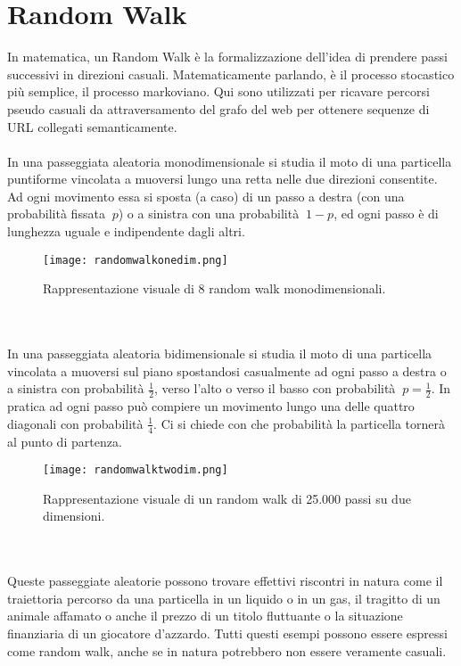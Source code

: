 \section{Random Walk}
In matematica, un Random Walk è la formalizzazione dell'idea di prendere passi successivi in direzioni casuali. Matematicamente parlando, è il processo stocastico più semplice, il processo markoviano. Qui sono utilizzati per ricavare percorsi pseudo casuali da attraversamento del grafo del web per ottenere sequenze di URL collegati semanticamente.
\\\\
In una passeggiata aleatoria monodimensionale si studia il moto di una particella puntiforme vincolata a muoversi lungo una retta nelle due direzioni consentite. Ad ogni movimento essa si sposta (a caso) di un passo a destra (con una probabilità fissata $\ p$) o a sinistra con una probabilità $\ 1-p$, ed ogni passo è di lunghezza uguale e indipendente dagli altri.
\begin{figure}[htb]
	\centering
	\texttt{[image: randomwalkonedim.png]}
	\caption{Rappresentazione visuale di 8 random walk monodimensionali. }
	\label{englishchinese}
\end{figure}
\\\\
In una passeggiata aleatoria bidimensionale si studia il moto di una particella vincolata a muoversi sul piano spostandosi casualmente ad ogni passo a destra o a sinistra con probabilità $\frac{1}{2}$, verso l'alto o verso il basso con probabilità $\ p=\frac{1}{2}$. In pratica ad ogni passo può compiere un movimento lungo una delle quattro diagonali con probabilità $\frac{1}{4}$. Ci si chiede con che probabilità la particella tornerà al punto di partenza.
\begin{figure}[htb]
	\centering
	\texttt{[image: randomwalktwodim.png]}
	\caption{Rappresentazione visuale di un random walk di 25.000 passi su due dimensioni. }
	\label{englishchinese}
\end{figure}
\\\\
Queste passeggiate aleatorie possono trovare effettivi riscontri in natura come il traiettoria percorso da una particella in un liquido o in un gas, il tragitto di un animale affamato o anche il prezzo di un titolo fluttuante o la situazione finanziaria di un giocatore d'azzardo. Tutti questi esempi possono essere espressi come random walk, anche se in natura potrebbero non essere veramente casuali.
\\\\
